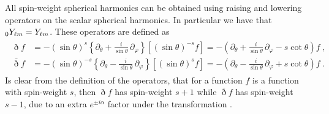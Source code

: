 All spin-weight spherical harmonics can be obtained using raising and lowering operators on the scalar spherical harmonics. In particular we have that $\uu[0]{Y}{\ell m} = Y_{\ell m}$.
These operators are defined as
\begin{align}
	\begin{split}
		\eth f &= - (\sin{\theta})^s \left\{ \partial_\theta + \frac{i}{\sin{\theta}} \, \partial_\varphi \right\} \left[ (\sin{\theta})^{-s} f \right] 
		= - \left( \partial_\theta + \frac{i}{\sin{\theta}} \, \partial_\varphi - s \cot\theta \right) f ~, \\
		\bar{\eth} f &= - (\sin{\theta})^{-s} \left\{ \partial_\theta - \frac{i}{\sin{\theta}} \, \partial_\varphi \right\} \left[ (\sin{\theta})^{s} f \right]
		= - \left( \partial_\theta - \frac{i}{\sin{\theta}} \, \partial_\varphi + s \cot\theta \right) f ~.
	\end{split}
\end{align}
Is clear from the definition of the operators, that for a function $f$ is a function with spin-weight $s$, then $\eth f$ has spin-weight $s+1$ while $\bar\eth f$ has spin-weight $s-1$, due to an extra $e^{\pm i \alpha}$ factor under the transformation .

